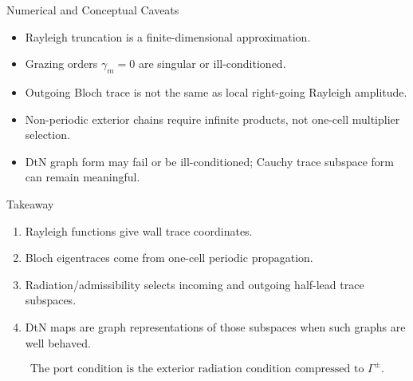 \documentclass[aspectratio=169]{beamer}
\begin{document}

\begin{frame}{Numerical and Conceptual Caveats}
  \begin{itemize}
    \item Rayleigh truncation is a finite-dimensional approximation.
    \item Grazing orders \(\gamma_m=0\) are singular or ill-conditioned.
    \item Outgoing Bloch trace is not the same as local right-going Rayleigh
    amplitude.
    \item Non-periodic exterior chains require infinite products, not one-cell
    multiplier selection.
    \item DtN graph form may fail or be ill-conditioned; Cauchy trace
    subspace form can remain meaningful.
  \end{itemize}
\end{frame}

\begin{frame}{Takeaway}
  \begin{enumerate}
    \item Rayleigh functions give wall trace coordinates.
    \item Bloch eigentraces come from one-cell periodic propagation.
    \item Radiation/admissibility selects incoming and outgoing half-lead
    trace subspaces.
    \item DtN maps are graph representations of those subspaces when such
    graphs are well behaved.
  \end{enumerate}
  \[
    \boxed{\text{The port condition is the exterior radiation condition compressed to }\Gamma^\pm.}
  \]
\end{frame}
\end{document}
